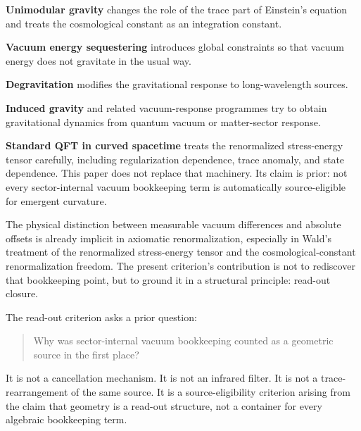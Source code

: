 \documentclass[12pt,a4paper]{article}
\theoremstyle{definition}
\theoremstyle{remark}
\begin{document}
\textbf{Unimodular gravity} changes the role of the trace part of Einstein's equation and treats the cosmological constant as an integration constant.

\textbf{Vacuum energy sequestering} introduces global constraints so that vacuum energy does not gravitate in the usual way.

\textbf{Degravitation} modifies the gravitational response to long-wavelength sources.

\textbf{Induced gravity} and related vacuum-response programmes try to obtain gravitational dynamics from quantum vacuum or matter-sector response.

\textbf{Standard QFT in curved spacetime} treats the renormalized stress-energy tensor carefully, including regularization dependence, trace anomaly, and state dependence. This paper does not replace that machinery. Its claim is prior: not every sector-internal vacuum bookkeeping term is automatically source-eligible for emergent curvature.

The physical distinction between measurable vacuum differences and absolute offsets is already implicit in axiomatic renormalization, especially in Wald's treatment of the renormalized stress-energy tensor and the cosmological-constant renormalization freedom. The present criterion's contribution is not to rediscover that bookkeeping point, but to ground it in a structural principle: read-out closure.

The read-out criterion asks a prior question:

\begin{quote}
Why was sector-internal vacuum bookkeeping counted as a geometric source in the first place?
\end{quote}

It is not a cancellation mechanism. It is not an infrared filter. It is not a trace-rearrangement of the same source. It is a source-eligibility criterion arising from the claim that geometry is a read-out structure, not a container for every algebraic bookkeeping term.
\end{document}
